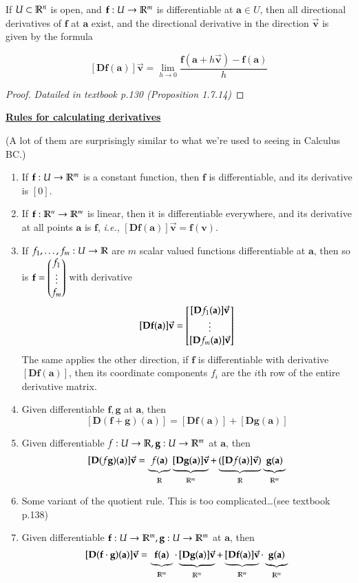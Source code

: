 
\begin{proposition}
If $U\subset \mathbb{R}^n$ is open, and $\textbf{f}:U\to\mathbb{R}^m$ is differentiable at $\bm{a}\in U$, then all directional derivatives of $\bm{f}$ at $\bm{a}$ exist, and the directional derivative in the direction $\vec{\bm{v}}$ is given by the formula

\[[\bm{Df} (\bm{a})]\vec{\bm{v}} = \lim_{h\to 0}\frac{\bm{f}(\bm{a}+h\vec{\bm{v}})-\bm{f}(\bm{a})}{h}\]
\end{proposition}

\begin{proof}
  \textit{Datailed in textbook p.130 (Proposition 1.7.14)}\end{proof}

\ul{\textbf{Rules for calculating derivatives}}

(A lot of them are surprisingly similar to what we're used to seeing in Calculus BC.)
\begin{enumerate}[1.]
  \item If $\textbf{f} : U \to \mathbb{R}^m$ is a constant function, then $\bm{f}$ is differentiable, and its derivative is $[0]$.
  \item If $\textbf{f} : \mathbb{R}^n \to \mathbb{R}^m$ is linear, then it is differentiable everywhere, and its derivative at all points $\bm{a}$ is $\bm{f}$, \textit{i.e.}, $[\bm{Df}(\bm{a})]\vec{\bm{v}}=\bm{f}(\bm{v})$. 
  \item If $f_1, \dots, f_m : U \to \mathbb{R}$ are $m$ scalar valued functions differentiable at $\bm{a}$, then so is $\textbf{f}=\begin{pmatrix} f_1 \\ \vdots \\ f_m \end{pmatrix}$ with derivative
  \[[\bm{Df}(\bm{a})]\vec{\bm{v}}=\mtrx{[\bm{D}f_1(\bm{a})]\vec{\bm{v}} \\ \vdots \\ [\bm{D}f_m(\bm{a})]\vec{\bm{v}}}\]
  The same applies the other direction, if $\bm{f}$ is differentiable with derivative $[\bm{Df}(\bm{a})]$, then its coordinate components $f_i$ are the $i$th row of the entire derivative matrix. 
  \item Given differentiable $\bm{f}, \bm{g}$ at $\bm{a}$, then
  \[[\bm{D}(\bm{f}+\bm{g})(\bm{a})] = [\bm{D}\bm{f}(\bm{a})]+[\bm{D}\bm{g}(\bm{a})]\]
  \item Given differentiable $f : U\to \mathbb{R}, \textbf{g} : U\to \mathbb{R}^m$ at $\bm{a}$, then 
  \[[\textbf{D}(f\textbf{g})(\textbf{a})]\vec{\textbf{v}} = \underbrace{f(\textbf{a})}_{\mathbb{R}} \underbrace{[\textbf{D}\textbf{g}(\textbf{a})]\vec{\textbf{v}}}_{\mathbb{R}^m}+\underbrace{([\textbf{D}f(\textbf{a})]\vec{\textbf{v}})}_{\mathbb{R}}\underbrace{\textbf{g}(\textbf{a})}_{\mathbb{R}^m}\]
  \item Some variant of the quotient rule. This is too complicated\dots (see textbook p.138)
  \item Given differentiable $\textbf{f} : U\to \mathbb{R}^m, \textbf{g} : U\to \mathbb{R}^m$ at $\bm{a}$, then 
  \[[\textbf{D}(\textbf{f}\cdot\textbf{g})(\textbf{a})]\vec{\textbf{v}} = \underbrace{\textbf{f}(\textbf{a})}_{\mathbb{R}^m} \cdot \underbrace{[\textbf{D}\textbf{g}(\textbf{a})]\vec{\textbf{v}}}_{\mathbb{R}^m}+\underbrace{[\textbf{D}\textbf{f}(\textbf{a})]\vec{\textbf{v}}}_{\mathbb{R}^m}\cdot \underbrace{\textbf{g}(\textbf{a})}_{\mathbb{R}^m}\]

\end{enumerate}

